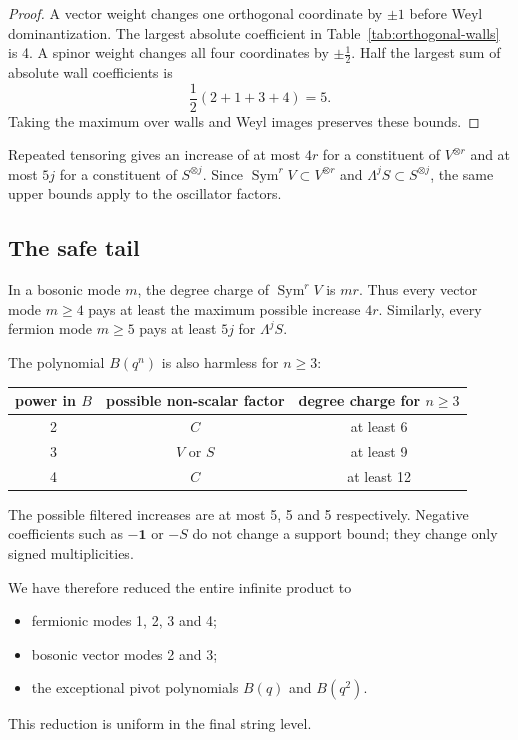 \documentclass[11pt,a4paper]{article}
\theoremstyle{definition}
\newcommand{\one}{\mathbf{1}}
\begin{document}
\begin{proof}
A vector weight changes one orthogonal coordinate by $\pm1$ before Weyl
dominantization.  The largest absolute coefficient in
Table~\ref{tab:orthogonal-walls} is 4.  A spinor weight changes all four
coordinates by $\pm\tfrac12$.  Half the largest sum of absolute wall
coefficients is
\[
   \frac12(2+1+3+4)=5.
\]
Taking the maximum over walls and Weyl images preserves these bounds.
\end{proof}

Repeated tensoring gives an increase of at most $4r$ for a constituent of
$V^{\otimes r}$ and at most $5j$ for a constituent of $S^{\otimes j}$.
Since $\operatorname{Sym}^rV\subset V^{\otimes r}$ and
$\Lambda^jS\subset S^{\otimes j}$, the same upper bounds apply to the
oscillator factors.

\subsection{The safe tail}

In a bosonic mode $m$, the degree charge of $\operatorname{Sym}^rV$ is $mr$.
Thus every vector mode $m\geq4$ pays at least the maximum possible increase
$4r$.  Similarly, every fermion mode $m\geq5$ pays at least $5j$ for
$\Lambda^jS$.

The polynomial $B(q^n)$ is also harmless for $n\geq3$:
\begin{center}
\begin{tabular}{ccc}
\toprule
power in $B$ & possible non-scalar factor & degree charge for $n\geq3$ \\
\midrule
2 & $C$ & at least 6 \\
3 & $V$ or $S$ & at least 9 \\
4 & $C$ & at least 12 \\
\bottomrule
\end{tabular}
\end{center}
The possible filtered increases are at most 5, 5 and 5 respectively.
Negative coefficients such as $-\one$ or $-S$ do not change a support bound;
they change only signed multiplicities.

We have therefore reduced the entire infinite product to
\begin{itemize}
  \item fermionic modes 1, 2, 3 and 4;
  \item bosonic vector modes 2 and 3;
  \item the exceptional pivot polynomials $B(q)$ and $B(q^2)$.
\end{itemize}
This reduction is uniform in the final string level.
\end{document}

